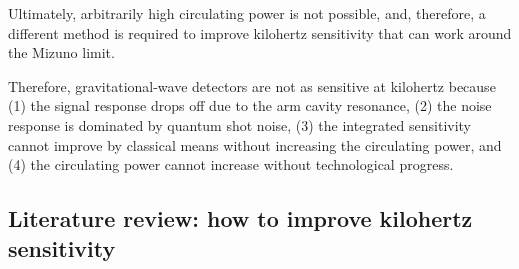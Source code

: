 Ultimately, arbitrarily high circulating power is not possible, and, therefore, a different method is required to improve kilohertz sensitivity that can work around the Mizuno limit.

Therefore, gravitational-wave detectors are not as sensitive at kilohertz because (1) the signal response drops off due to the arm cavity resonance, (2) the noise response is dominated by quantum shot noise, (3) the integrated sensitivity cannot improve by classical means without increasing the circulating power, and (4) the circulating power cannot increase without technological progress.



\subsection{Literature review: how to improve kilohertz sensitivity}
\label{sec:intro_literature_review}

